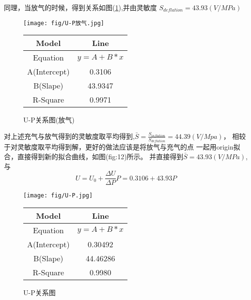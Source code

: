 \documentclass[a4paper,UTF8]{ctexart}
\begin{document}
同理，当放气的时候，得到关系如图(\ref*{fig:10}),并由灵敏度
$S_{deflation}=43.93(V/MPa)$
\begin{figure}[!hp]
    \vspace{-10pt}
    \begin{minipage}{0.65\linewidth}
        \centering
        \texttt{[image: fig/U-P放气.jpg]}   
    \end{minipage}
    \hfill
    \begin{minipage}{0.3\linewidth}
        \begin{center}
            \begin{tabular}{c|c}
                \hline
                Model & Line\\
                \hline
                Equation & $y=A+B*x$\\
                \hline
                A(Intercept) & 0.3106\\
                \hline
                B(Slape) & 43.9347\\
                \hline
                R-Square & 0.9971\\
                \hline
            \end{tabular}
        \end{center}
    \end{minipage}
    \caption{U-P关系图(放气)}
    \label{fig:10}
\end{figure}
\newpage
对上述充气与放气得到的灵敏度取平均得到,$\bar{S}=\frac{S_{inflation}}{S_{deflation}}
=44.39(V/Mpa)$，
相较于对灵敏度取平均得到解，更好的做法应该是将放气与充气的点
一起用origin拟合，直接得到新的拟合曲线，如图({fig:12})所示。
并直接得到$\bar{S}=43.93(V/MPa)$,与
\begin{equation}
    U=U_0+\frac{\Delta U}{\Delta P}P=0.3106+43.93P
    \label{eqs:13}
\end{equation}
\begin{figure}[!hp]
    \begin{minipage}{0.65\linewidth}
        \centering
        \texttt{[image: fig/U-P.jpg]}   
    \end{minipage}
    \hfill
    \begin{minipage}{0.3\linewidth}
        \begin{center}
            \begin{tabular}{c|c}
                \hline
                Model & Line\\
                \hline
                Equation & $y=A+B*x$\\
                \hline
                A(Intercept) & 0.30492\\
                \hline
                B(Slape) & 44.46286\\
                \hline
                R-Square & 0.9980\\
                \hline
            \end{tabular}
        \end{center}
    \end{minipage}
    \caption{U-P关系图}
    \label{fig:12}
\end{figure}
\end{document}
